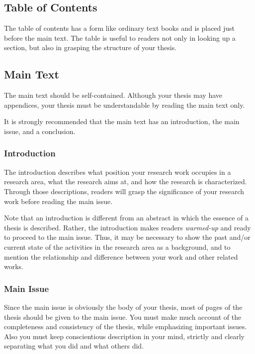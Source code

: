 \documentclass[master,english]{kuisthesis}
\begin{document}
\subsection{Table of Contents}\label{subsec-toc}
The table of contents has a form like ordinary text books and is placed just
before the main text.  The table is useful to readers not only in looking up
a section, but also in grasping the structure of your thesis.

\subsection{Main Text}\label{subsec-main}
The main text should be self-contained.  Although your thesis may have
appendices, your thesis must be understandable by reading the main text
only.

It is strongly recommended that the main text has an introduction, the main
issue, and a conclusion.

\subsubsection{Introduction}\label{subsubsec-intro}
The introduction describes what position your research work occupies in a
research area, what the research aims at, and how the research is
characterized.   Through those descriptions, readers will grasp the
significance of your research work before reading the main issue.

Note that an introduction is different from an abstract in which the essence
of a thesis is described.  Rather, the introduction makes readers {\em
warmed-up} and ready to proceed to the main issue.  Thus, it may be
necessary to show the past and/or current state of the activities in the
research area as a background, and to mention the relationship and
difference between your work and other related works.

\subsubsection{Main Issue}\label{subsubsec-main}
Since the main issue is obviously the body of your thesis, most of pages of
the thesis should be given to the main issue.  You must make much account of
the completeness and consistency of the thesis, while emphasizing important
issues.  Also you must keep conscientious description in your mind, strictly
and clearly separating what you did and what others did.
\end{document}
